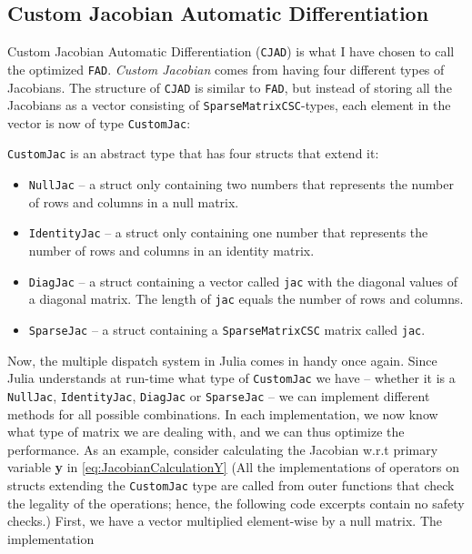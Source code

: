 \subsection{Custom Jacobian Automatic Differentiation}
Custom Jacobian Automatic Differentiation (\texttt{CJAD}) is what I have chosen to call the optimized \texttt{FAD}. \textit{Custom Jacobian} comes from having four different types of Jacobians. The structure of \texttt{CJAD} is similar to \texttt{FAD}, but instead of storing all the Jacobians as a vector consisting of \texttt{SparseMatrixCSC}-types, each element in the vector is now of type \texttt{CustomJac}:

\texttt{CustomJac} is an abstract type that has four structs that extend it:
\begin{itemize}
    \item \texttt{NullJac} -- a struct only containing two numbers that represents the number of rows and columns in a null matrix.
    \item \texttt{IdentityJac} -- a struct only containing one number that represents the number of rows and columns in an identity matrix.
    \item \texttt{DiagJac} -- a struct containing a vector called \texttt{jac} with the diagonal values of a diagonal matrix. The length of \texttt{jac} equals the number of rows and columns.
    \item \texttt{SparseJac} -- a struct containing a \texttt{SparseMatrixCSC} matrix called \texttt{jac}.
\end{itemize}
Now, the multiple dispatch system in Julia comes in handy once again. Since Julia understands at run-time what type of \texttt{CustomJac} we have -- whether it is a \texttt{NullJac}, \texttt{IdentityJac}, \texttt{DiagJac} or \texttt{SparseJac} -- we can implement different methods for all possible combinations. In each implementation, we now know what type of matrix we are dealing with, and we can thus optimize the performance. As an example, consider calculating the Jacobian w.r.t primary variable \textbf{y} in \eqref{eq:JacobianCalculationY} (All the implementations of operators on structs extending the \texttt{CustomJac} type are called from outer functions that check the legality of the operations; hence, the following code excerpts contain no safety checks.) First, we have a vector multiplied element-wise by a null matrix. The implementation

